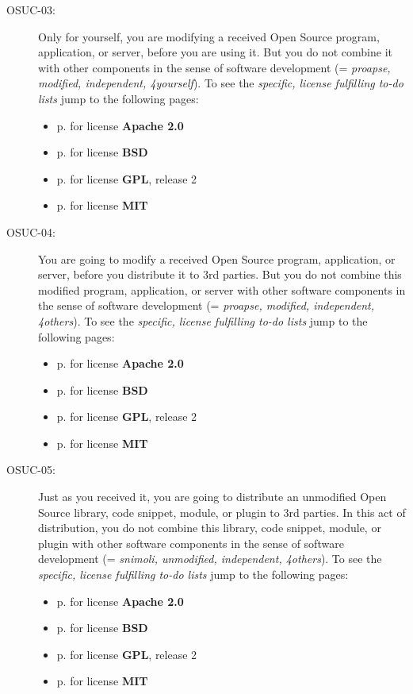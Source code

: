 \begin{description}
\item[OSUC-03:]\label{OSUC-03-DEF} Only for yourself, you are modifying a
received Open Source program, application, or server, before you are using it.
But you do not combine it with other components in the sense of software
development (= \textit{proapse, modified, independent, 4yourself}).
To see the \textit{specific, license fulfilling to-do lists} jump to the
following pages:
  \begin{itemize}
    \item p. \pageref{OSUC-03-Apache20} for license \textbf{Apache 2.0}
    \item p. \pageref{OSUC-03-BSD} for license \textbf{BSD}
    \item p. \pageref{OSUC-03-GPL2X} for license \textbf{GPL}, release 2
    \item p. \pageref{OSUC-03-MIT} for license \textbf{MIT}
  \end{itemize}

\item[OSUC-04:]\label{OSUC-04-DEF} You are going to modify a received Open
Source program, application, or server, before you distribute it to 3rd parties.
But you do not combine this modified program, application, or server with other
software components in the sense of software development (= \textit{proapse,
modified, independent, 4others}).
To see the \textit{specific, license fulfilling to-do lists} jump to the
following pages:
  \begin{itemize}
    \item p. \pageref{OSUC-04-Apache20} for license \textbf{Apache 2.0}
    \item p. \pageref{OSUC-04-BSD} for license \textbf{BSD}
    \item p. \pageref{OSUC-04-GPL2X} for license \textbf{GPL}, release 2
    \item p. \pageref{OSUC-04-MIT} for license \textbf{MIT}
  \end{itemize}

\item[OSUC-05:]\label{OSUC-05-DEF} Just as you received it, you are going to
distribute an unmodified Open Source library, code snippet, module, or plugin to
3rd parties. In this act of distribution, you do not combine this library, code
snippet, module, or plugin with other software components in the sense of
software development (= \textit{snimoli, unmodified, independent, 4others}).
To see the \textit{specific, license fulfilling to-do lists} jump to the
following pages:
  \begin{itemize}
    \item p. \pageref{OSUC-05-Apache20} for license \textbf{Apache 2.0}
    \item p. \pageref{OSUC-05-BSD} for license \textbf{BSD}
    \item p. \pageref{OSUC-05-GPL2X} for license \textbf{GPL}, release 2
    \item p. \pageref{OSUC-05-MIT} for license \textbf{MIT}
  \end{itemize}


\end{description}
